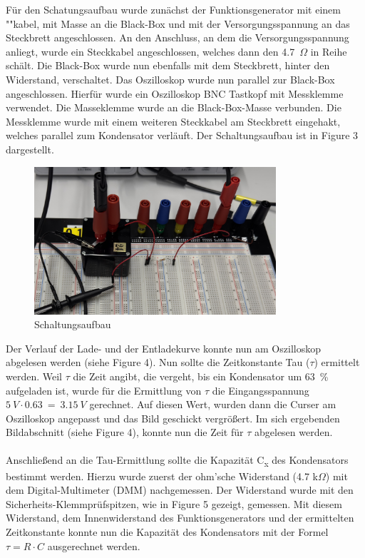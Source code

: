 \documentclass[a4paper,12pt]{article}
\begin{document}
\noindent Für den Schatungsaufbau wurde zunächst der Funktionsgenerator mit einem ""kabel, mit Masse an die Black-Box und mit der Versorgungsspannung an das Steckbrett angeschlossen. An den Anschluss, an dem die Versorgungsspannung anliegt, wurde ein Steckkabel angeschlossen, welches dann den 4.7~$\Omega$ in Reihe schält. Die Black-Box wurde nun ebenfalls mit dem Steckbrett, hinter den Widerstand, verschaltet. Das Oszilloskop wurde nun parallel zur Black-Box angeschlossen. Hierfür wurde ein Oszilloskop BNC Tastkopf mit Messklemme verwendet. Die Masseklemme wurde an die Black-Box-Masse verbunden. Die Messklemme wurde mit einem weiteren Steckkabel am Steckbrett eingehakt, welches parallel zum Kondensator verläuft. Der Schaltungsaufbau ist in Figure 3 dargestellt.

\begin{figure}[H]
    \centering
    \includegraphics[width=0.8\textwidth]{../Quellen/Labor2/IMG_3965 - Kopie.jpeg}
\caption{Schaltungsaufbau}
\end{figure}

\noindent Der Verlauf der Lade- und der Entladekurve konnte nun am Oszilloskop abgelesen werden (siehe Figure 4). Nun sollte die Zeitkonstante Tau ($\tau$) ermittelt werden. Weil $\tau$ die Zeit angibt, die vergeht, bis ein Kondensator um 63~\% aufgeladen ist, wurde für die Ermittlung von $\tau$ die Eingangsspannung \(5~V \cdot 0.63~=~3.15~V\) gerechnet. Auf diesen Wert, wurden dann die Curser am Oszilloskop angepasst und das Bild geschickt vergrößert. Im sich ergebenden Bildabschnitt (siehe Figure 4), konnte nun die Zeit für $\tau$ abgelesen werden.\\\\
Anschließend an die Tau-Ermittlung sollte die Kapazität C\textsubscript{x} des Kondensators bestimmt werden. Hierzu wurde zuerst der ohm'sche Widerstand (4.7 k$\Omega$) mit dem Digital-Multimeter (DMM) nachgemessen. Der Widerstand wurde mit den Sicherheits-Klemmprüfspitzen, wie in Figure 5 gezeigt, gemessen. Mit diesem Widerstand, dem Innenwiderstand des Funktionsgenerators und der ermittelten Zeitkonstante konnte nun die Kapazität des Kondensators mit der Formel $\tau = R \cdot C$ ausgerechnet werden.
\end{document}
